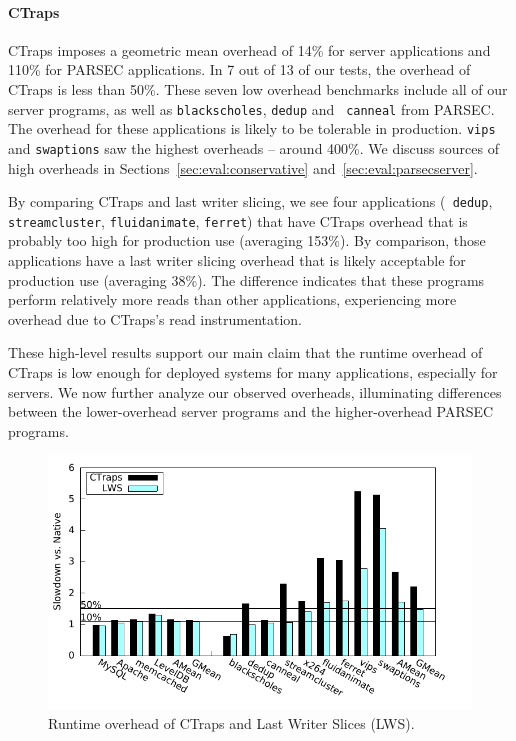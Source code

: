 \documentclass[preprint,9pt]{sigplanconf}
\newcommand{\ctraps}{CTraps\xspace}
\begin{document}
\paragraph{\ctraps}
\ctraps imposes a geometric mean overhead of 14\% for server applications and
110\% for PARSEC applications.  In 7 out of 13 of our tests, the overhead of
\ctraps is less than 50\%.  These seven low overhead benchmarks include all of
our server programs, as well as {\tt blackscholes}, {\tt dedup} and {\tt
canneal} from PARSEC.  The overhead for these applications is likely to be
tolerable in production.  {\tt vips} and {\tt swaptions} saw the highest
overheads -- around 400\%.  We discuss sources of high overheads in
Sections~\ref{sec:eval:conservative} and~\ref{sec:eval:parsecserver}.

By comparing \ctraps and last writer slicing, we see four applications ({\tt
dedup}, {\tt streamcluster}, {\tt fluidanimate}, {\tt ferret}) that have
\ctraps overhead that is probably too high for production use (averaging
153\%).  By comparison, those applications have a last writer slicing overhead
that is likely acceptable for production use (averaging 38\%).  The difference
indicates that these programs perform relatively more reads than other
applications, experiencing more overhead due to \ctraps's read instrumentation.

These high-level results support our main claim that the runtime overhead of
\ctraps is low enough for deployed systems for many applications, especially
for servers.  We now further analyze our observed overheads, illuminating
differences between the lower-overhead server programs and the higher-overhead
PARSEC programs.

\begin{figure}
\centering
\includegraphics[width=.9\columnwidth]{plots/perf.pdf}
\caption{\label{fig:perfall}Runtime overhead of \ctraps and Last Writer Slices (LWS).}
\end{figure}
\end{document}
